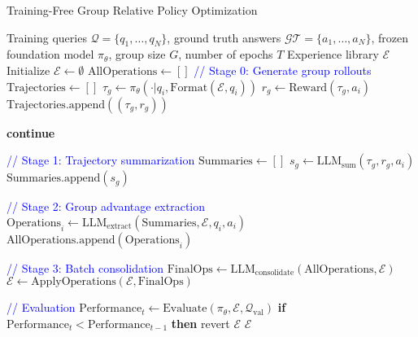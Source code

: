 \documentclass[11pt,a4paper]{article}
\begin{document}
\begin{algorithm}[H]
\caption{Training-Free Group Relative Policy Optimization}
\label{alg:tfgrpo}
\begin{algorithmic}[1]
\REQUIRE Training queries $\mathcal{Q} = \{q_1, \ldots, q_N\}$, ground truth answers $\mathcal{GT} = \{a_1, \ldots, a_N\}$, frozen foundation model $\pi_\theta$, group size $G$, number of epochs $T$
\ENSURE Experience library $\mathcal{E}$
\STATE Initialize $\mathcal{E} \leftarrow \emptyset$
    \STATE $\text{AllOperations} \leftarrow []$
        \STATE \textcolor{blue}{// Stage 0: Generate group rollouts}
        \STATE $\text{Trajectories} \leftarrow []$
            \STATE $\tau_g \leftarrow \pi_\theta(\cdot | q_i, \text{Format}(\mathcal{E}, q_i))$ 
            \STATE $r_g \leftarrow \text{Reward}(\tau_g, a_i)$ 
            \STATE $\text{Trajectories}.\text{append}((\tau_g, r_g))$
        \ENDFOR

            \STATE \textbf{continue} 
        \ENDIF

        \STATE \textcolor{blue}{// Stage 1: Trajectory summarization}
        \STATE $\text{Summaries} \leftarrow []$
            \STATE $s_g \leftarrow \text{LLM}_{\text{sum}}(\tau_g, r_g, a_i)$ 
            \STATE $\text{Summaries}.\text{append}(s_g)$
        \ENDFOR

        \STATE \textcolor{blue}{// Stage 2: Group advantage extraction}
        \STATE $\text{Operations}_i \leftarrow \text{LLM}_{\text{extract}}(\text{Summaries}, \mathcal{E}, q_i, a_i)$
        \STATE $\text{AllOperations}.\text{append}(\text{Operations}_i)$
    \ENDFOR

    \STATE \textcolor{blue}{// Stage 3: Batch consolidation}
    \STATE $\text{FinalOps} \leftarrow \text{LLM}_{\text{consolidate}}(\text{AllOperations}, \mathcal{E})$
    \STATE $\mathcal{E} \leftarrow \text{ApplyOperations}(\mathcal{E}, \text{FinalOps})$

    \STATE \textcolor{blue}{// Evaluation}
    \STATE $\text{Performance}_t \leftarrow \text{Evaluate}(\pi_\theta, \mathcal{E}, \mathcal{Q}_{\text{val}})$
    \STATE \textbf{if} $\text{Performance}_t < \text{Performance}_{t-1}$ \textbf{then} revert $\mathcal{E}$
\ENDFOR
\RETURN $\mathcal{E}$
\end{algorithmic}
\end{algorithm}
\end{document}
